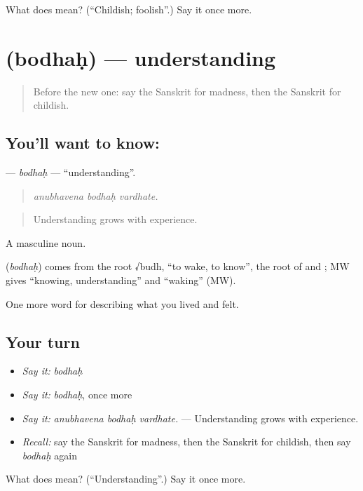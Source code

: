 \begin{tcolorbox}[breakable,colback=teal!4,colframe=teal!35!black,title={Before you move on}]
What does  mean? (\textquotedblleft{}Childish; foolish\textquotedblright{}.) Say it once more.
\end{tcolorbox}
\section[\texorpdfstring{\sk{बोधः} (bodhaḥ)}{बोधः (bodhaḥ)}]{ (bodhaḥ) — understanding}

\label{lesson:SA-C466-bodhah}



\begin{quote}
Before the new one: say the Sanskrit for madness, then the Sanskrit for childish.
\end{quote}

\subsection*{You'll want to know: }
\textbf{} — \emph{bodhaḥ} — \textquotedblleft{}understanding\textquotedblright{}.

\begin{quote}
  
\end{quote}

\begin{quote}
\emph{anubhavena bodhaḥ vardhate.}
\end{quote}

\begin{quote}
Understanding grows with experience.
\end{quote}

A masculine noun.

\begin{cousinweb}
\textbf{} (\emph{bodhaḥ}) comes from the root √budh, \textquotedblleft{}to wake, to know\textquotedblright{}, the root of \textbf{} and \textbf{}; MW gives \textquotedblleft{}knowing, understanding\textquotedblright{} and \textquotedblleft{}waking\textquotedblright{} (MW).
\end{cousinweb}

\begin{grammarlens}[title={What you've built}]
One more word for describing what you lived and felt.
\end{grammarlens}

\subsection*{Your turn}
\begin{itemize}
\raggedright
  \item \emph{Say it:} \emph{bodhaḥ}
  \item \emph{Say it:} \emph{bodhaḥ}, once more
  \item \emph{Say it:} \emph{anubhavena bodhaḥ vardhate.} — Understanding grows with experience.
  \item \emph{Recall:} say the Sanskrit for madness, then the Sanskrit for childish, then say \emph{bodhaḥ} again
\end{itemize}

\begin{tcolorbox}[breakable,colback=teal!4,colframe=teal!35!black,title={Before you move on}]
What does  mean? (\textquotedblleft{}Understanding\textquotedblright{}.) Say it once more.
\end{tcolorbox}
